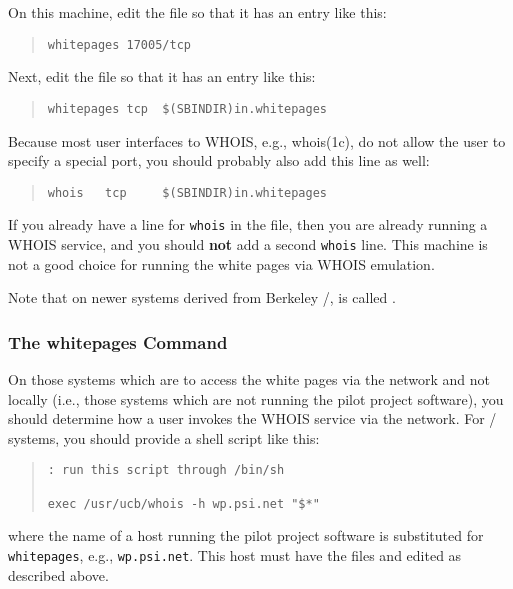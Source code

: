On this machine,
edit the file  so that it has an entry like this:
\begin{quote}\small\begin{verbatim}
whitepages 17005/tcp
\end{verbatim}\end{quote}

Next,
edit the file  so that it has an entry like this:
\begin{quote}\small\begin{verbatim}
whitepages tcp  $(SBINDIR)in.whitepages
\end{verbatim}\end{quote}
Because most user interfaces to WHOIS,
e.g., \man whois(1c),
do not allow the user to specify a special port,
you should probably also add this line as well:
\begin{quote}\small\begin{verbatim}
whois   tcp     $(SBINDIR)in.whitepages
\end{verbatim}\end{quote}
If you already have a line for \verb"whois" in the  file,
then you are already running a WHOIS service,
and you should {\bf not\/} add a second \verb"whois" line.
This machine is not a good choice for running the white pages via WHOIS
emulation.

Note that on newer systems derived from Berkeley \unix/,
 is called .

\subsubsection	{The whitepages Command}
On those systems which are to access the white pages via the network and not
locally
(i.e., those systems which are not running the pilot project software),
you should determine how a user invokes the WHOIS service via the network.
For \unix/ systems,
you should provide a shell script like this:
\begin{quote}\small\begin{verbatim}
: run this script through /bin/sh

exec /usr/ucb/whois -h wp.psi.net "$*"
\end{verbatim}\end{quote}
where the name of a host running the pilot project software is substituted for
\verb"whitepages", e.g., \verb"wp.psi.net".
This host must have the files  and 
edited as described above.

